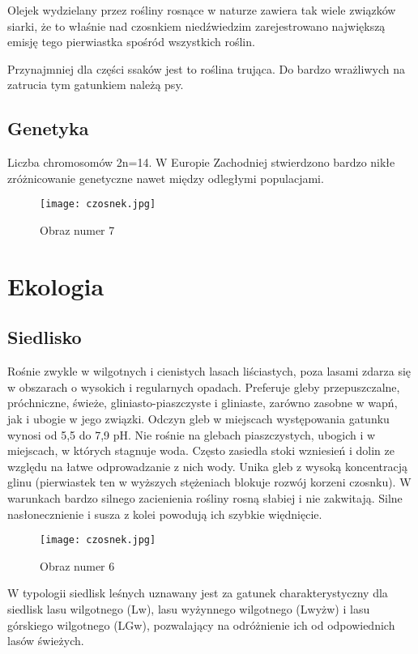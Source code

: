 Olejek wydzielany przez rośliny rosnące w naturze zawiera tak wiele związków siarki, że to właśnie nad czosnkiem niedźwiedzim zarejestrowano największą emisję tego pierwiastka spośród wszystkich roślin.

Przynajmniej dla części ssaków jest to roślina trująca. Do bardzo wrażliwych na zatrucia tym gatunkiem należą psy.

\subsection{Genetyka}
Liczba chromosomów 2n=14. W Europie Zachodniej stwierdzono bardzo nikłe zróżnicowanie genetyczne nawet między odległymi populacjami.

\begin{figure}
 \centering
 \texttt{[image: czosnek.jpg]}
 \caption{Obraz numer 7}
 \label{figure:example4}
\end{figure}

\section{Ekologia}
\subsection{Siedlisko}
Rośnie zwykle w wilgotnych i cienistych lasach liściastych, poza lasami zdarza się w obszarach o wysokich i regularnych opadach. Preferuje gleby przepuszczalne, próchniczne, świeże, gliniasto-piaszczyste i gliniaste, zarówno zasobne w wapń, jak i ubogie w jego związki. Odczyn gleb w miejscach występowania gatunku wynosi od 5,5 do 7,9 pH. Nie rośnie na glebach piaszczystych, ubogich i w miejscach, w których stagnuje woda. Często zasiedla stoki wzniesień i dolin ze względu na łatwe odprowadzanie z nich wody. Unika gleb z wysoką koncentracją glinu (pierwiastek ten w wyższych stężeniach blokuje rozwój korzeni czosnku). W warunkach bardzo silnego zacienienia rośliny rosną słabiej i nie zakwitają. Silne nasłonecznienie i susza z kolei powodują ich szybkie więdnięcie.

\begin{figure}
 \centering
 \texttt{[image: czosnek.jpg]}
 \caption{Obraz numer 6}
 \label{figure:example5}
\end{figure}
W typologii siedlisk leśnych uznawany jest za gatunek charakterystyczny dla siedlisk lasu wilgotnego (Lw), lasu wyżynnego wilgotnego (Lwyżw) i lasu górskiego wilgotnego (LGw), pozwalający na odróżnienie ich od odpowiednich lasów świeżych.

